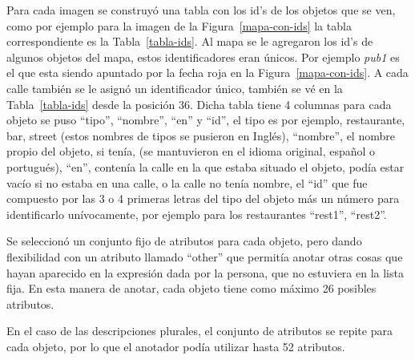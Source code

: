 Para cada imagen se construy\'o una tabla con los id's de los objetos que se ven, como por ejemplo para la imagen de la Figura~\ref{mapa-con-ids} la tabla correspondiente es la Tabla~\ref{tabla-ids}. Al mapa se le agregaron los id's de algunos objetos del mapa, estos identificadores eran \'unicos. Por ejemplo {\it pub1} es el que esta siendo apuntado por la fecha roja en la Figura~\ref{mapa-con-ids}. A cada calle tambi\'en se le asign\'o un identificador \'unico, tambi\'en se v\'e en la Tabla~\ref{tabla-ids} desde la posici\'on  36. Dicha tabla tiene 4 columnas para cada objeto se puso ``tipo'', ``nombre'', ``en'' y ``id'', el tipo es por ejemplo, restaurante, bar, street (estos nombres de tipos se pusieron en Ingl\'es), ``nombre'', el nombre propio del objeto, si ten\'ia, (se mantuvieron en el idioma original, espa\~nol o portugu\'es), ``en'', conten\'ia la calle en la que estaba situado el objeto, pod\'ia estar vac\'io si no estaba en una calle, o la calle no ten\'ia nombre, el ``id'' que fue compuesto por las 3 o 4 primeras letras del tipo del objeto m\'as un n\'umero para identificarlo un\'ivocamente, por ejemplo para los restaurantes ``rest1'', ``rest2''.


Se seleccion\'o un conjunto fijo de atributos para cada objeto, pero dando flexibilidad con un atributo llamado ``other'' que permit\'ia anotar otras cosas que hayan aparecido en la expresi\'on dada por la persona, que no estuviera en la lista fija. En esta manera de anotar, cada objeto tiene como m\'aximo 26 posibles atributos.

En el caso de las descripciones plurales, el conjunto de atributos se repite para cada objeto, por lo que el anotador pod\'{i}a utilizar hasta 52 atributos.

